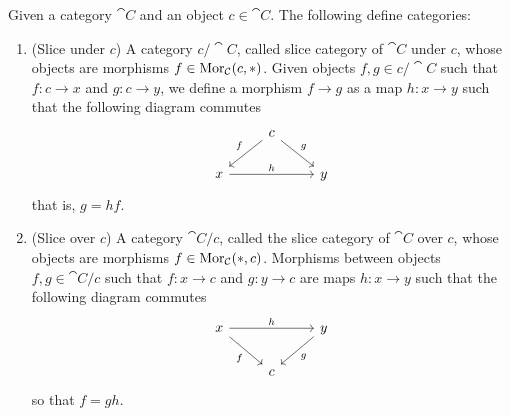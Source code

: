 \begin{proposition}\label{prop: slice cat}
Given a category \(\cat C\) and an object \(c \in \cat C\). The following
define categories:
\begin{enumerate}[(SC1)]
\item\label{prop: slice under}
  (Slice under \(c\)) A category \(c/\cat C\), called slice category of
  \(\cat C\) under \(c\), whose objects are morphisms \(f \in \operatorname{Mor}_{\mathcal
  C}(c, *)\). Given objects \(f, g \in c/\cat C\) such that \(f: c \to x\)
  and \(g: c \to y\), we define a morphism \(f \to g\) as a map \(h: x \to
  y\) such that the following diagram commutes
  \[
    \begin{tikzcd}
      &c \ar[dl, swap,"f"] \ar[dr, "g"]\\
      x \ar[rr, "h"] & &y
    \end{tikzcd}
  \]
  that is, \(g = h  f\).
\item\label{prop: slice over}
  (Slice over \(c\)) A category \(\cat C/c\), called the slice category of
  \(\cat C\) over \(c\), whose objects are morphisms \(f \in \operatorname{Mor}_{\mathcal
  C}(*, c)\). Morphisms between objects \(f, g \in \cat C/c\) such that \(f:
  x \to c\) and \(g: y \to c\) are maps \(h: x \to y\) such that the
  following diagram commutes
  \[
    \begin{tikzcd}
      x \ar[rr, "h"] \ar[dr, swap, "f"]
        & &y \ar[dl, "g"] \\
        &c
    \end{tikzcd}
  \]
  so that \(f = g  h\).
\end{enumerate}
\end{proposition}

